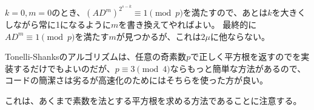 $k=0,m=0$のとき、$(AD^m)^{2^{s-k}}\equiv1\pmod{p}$を満たすので、あとは$k$を大きくしながら常に1になるように$m$を書き換えてやればよい。
最終的に$AD^m\equiv1\pmod{p}$を満たす$m$が見つかるが、これは$2\mu$に他ならない。

Tonelli-Shanksのアルゴリズムは、任意の奇素数$p$で正しく平方根を返すのでを実装するだけでもよいのだが、$p\equiv3\pmod{4}$ならもっと簡単な方法があるので、コードの簡潔さは劣るが高速化のためにはそちらを使った方が良い。


これは、あくまで素数を法とする平方根を求める方法であることに注意する。
